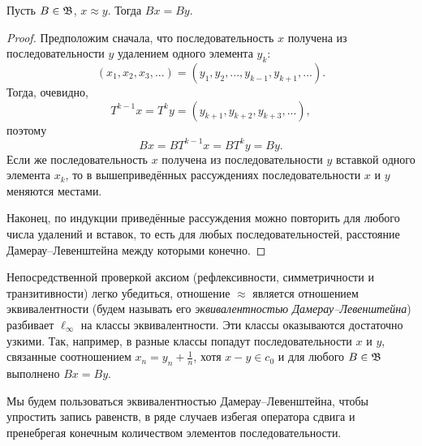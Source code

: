 \begin{lemma}
	Пусть $B\in\mathfrak{B}$, $x\approx y$.
	Тогда $Bx=By$.
\end{lemma}

\begin{proof}
	Предположим сначала, что последовательность $x$ получена из последовательности $y$ удалением одного элемента $y_k$:
	\begin{equation}
		(x_1, x_2, x_3,...) = (y_1, y_2, ..., y_{k-1}, y_{k+1}, ...)
		.
	\end{equation}
	Тогда, очевидно,
	\begin{equation}
		T^{k-1} x = T^{k}y = (y_{k+1}, y_{k+2}, y_{k+3}, ...)
		,
	\end{equation}
	поэтому
	\begin{equation}
		Bx = BT^{k-1}x = BT^{k}y = By
		.
	\end{equation}
	Если же последовательность $x$ получена из последовательности $y$ вставкой одного элемента $x_k$,
	то в вышеприведённых рассуждениях последовательности $x$ и $y$ меняются местами.

	Наконец, по индукции приведённые рассуждения можно повторить для любого числа удалений и вставок,
	то есть для любых последовательностей, расстояние Дамерау--Левенштейна между которыми конечно.
\end{proof}

Непосредственной проверкой аксиом (рефлексивности, симметричности и транзитивности) легко убедиться,
отношение $\approx$ является отношением эквивалентности (будем называть его \emph{эквивалентностью Дамерау--Левенштейна}) разбивает $\ell_\infty$ на классы эквивалентности.
Эти классы оказываются достаточно узкими.
Так, например, в разные классы попадут последовательности $x$ и $y$, связанные соотношением $x_n = y_n + \frac1n$,
хотя $x-y \in c_0$ и для любого $B\in\mathfrak{B}$ выполнено $Bx=By$.

Мы будем пользоваться эквивалентностью Дамерау--Левенштейна, чтобы упростить запись равенств,
в ряде случаев избегая оператора сдвига и пренебрегая конечным количеством элементов последовательности.
